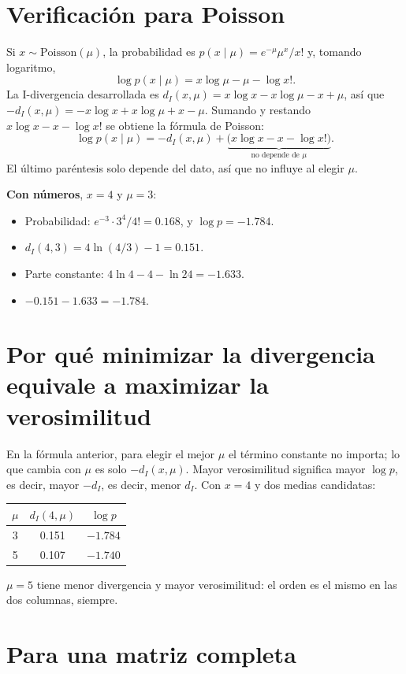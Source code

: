 \documentclass[11pt,a4paper]{article}
\begin{document}
\section{Verificación para Poisson}

Si $x\sim\mathrm{Poisson}(\mu)$, la probabilidad es $p(x\mid\mu)=e^{-\mu}\mu^x/x!$
y, tomando logaritmo,
\[
  \log p(x\mid\mu)=x\log\mu-\mu-\log x!.
\]
La I-divergencia desarrollada es $d_I(x,\mu)=x\log x-x\log\mu-x+\mu$, así que
$-d_I(x,\mu)=-x\log x+x\log\mu+x-\mu$. Sumando y restando $x\log x-x-\log x!$ se
obtiene la fórmula de Poisson:
\[
  \log p(x\mid\mu)=-d_I(x,\mu)+\underbrace{\bigl(x\log x-x-\log x!\bigr)}_{\text{no depende de }\mu}.
\]
El último paréntesis solo depende del dato, así que no influye al elegir $\mu$.

\textbf{Con números}, $x=4$ y $\mu=3$:
\begin{itemize}
  \item Probabilidad: $e^{-3}\cdot3^4/4!=0.168$, y $\log p=-1.784$.
  \item $d_I(4,3)=4\ln(4/3)-1=0.151$.
  \item Parte constante: $4\ln4-4-\ln24=-1.633$.
  \item $-0.151-1.633=-1.784$. \checkmark
\end{itemize}

\section{Por qué minimizar la divergencia equivale a maximizar la verosimilitud}

En la fórmula anterior, para elegir el mejor $\mu$ el término constante no
importa; lo que cambia con $\mu$ es solo $-d_I(x,\mu)$. Mayor verosimilitud
significa mayor $\log p$, es decir, mayor $-d_I$, es decir, menor $d_I$. Con
$x=4$ y dos medias candidatas:
\begin{center}
\begin{tabular}{ccc}
\toprule
$\mu$ & $d_I(4,\mu)$ & $\log p$ \\
\midrule
3 & 0.151 & $-1.784$ \\
5 & 0.107 & $-1.740$ \\
\bottomrule
\end{tabular}
\end{center}
$\mu=5$ tiene menor divergencia y mayor verosimilitud: el orden es el mismo en las
dos columnas, siempre.

\section{Para una matriz completa}
\end{document}
